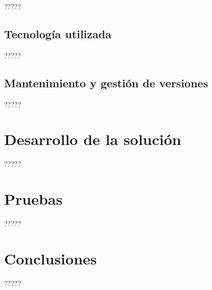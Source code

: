 \documentclass[11pt,spanish,listoffigures]{tfgetsinf}
\begin{document}
?????

\section{Tecnología utilizada}

?????

\section{Mantenimiento y gestión de versiones}

?????


\chapter{Desarrollo de la solución}

?????


\chapter{Pruebas}

?????


\chapter{Conclusiones}

?????

\end{document}
